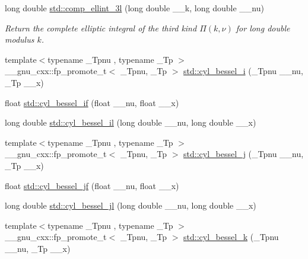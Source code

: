 \begin{DoxyCompactItemize}
long double \hyperlink{group__cxx17__math__spec__func_ga1ca081fee102cd0d4d6b091285e495e5}{std\+::comp\+\_\+ellint\+\_\+3l} (long double \+\_\+\+\_\+k, long double \+\_\+\+\_\+nu)
\begin{DoxyCompactList}\small\item\em Return the complete elliptic integral of the third kind $ \Pi(k,\nu) $ for {\ttfamily long double} modulus $ k $. \end{DoxyCompactList}\item 
{\footnotesize template$<$typename \+\_\+\+Tpnu , typename \+\_\+\+Tp $>$ }\\\+\_\+\+\_\+gnu\+\_\+cxx\+::fp\+\_\+promote\+\_\+t$<$ \+\_\+\+Tpnu, \+\_\+\+Tp $>$ \hyperlink{group__cxx17__math__spec__func_ga29504b6008798072b0b8d6ea5a50ec60}{std\+::cyl\+\_\+bessel\+\_\+i} (\+\_\+\+Tpnu \+\_\+\+\_\+nu, \+\_\+\+Tp \+\_\+\+\_\+x)
\item 
float \hyperlink{group__cxx17__math__spec__func_gaaf738427d4da0bda66bc2274dfb853a7}{std\+::cyl\+\_\+bessel\+\_\+if} (float \+\_\+\+\_\+nu, float \+\_\+\+\_\+x)
\item 
long double \hyperlink{group__cxx17__math__spec__func_gab7962629216d03efb8ecaa3f70c6878f}{std\+::cyl\+\_\+bessel\+\_\+il} (long double \+\_\+\+\_\+nu, long double \+\_\+\+\_\+x)
\item 
{\footnotesize template$<$typename \+\_\+\+Tpnu , typename \+\_\+\+Tp $>$ }\\\+\_\+\+\_\+gnu\+\_\+cxx\+::fp\+\_\+promote\+\_\+t$<$ \+\_\+\+Tpnu, \+\_\+\+Tp $>$ \hyperlink{group__cxx17__math__spec__func_ga644f7eb975809674db88768f2f115744}{std\+::cyl\+\_\+bessel\+\_\+j} (\+\_\+\+Tpnu \+\_\+\+\_\+nu, \+\_\+\+Tp \+\_\+\+\_\+x)
\item 
float \hyperlink{group__cxx17__math__spec__func_ga15731a7bccd6351d28353e3c4c2a2d23}{std\+::cyl\+\_\+bessel\+\_\+jf} (float \+\_\+\+\_\+nu, float \+\_\+\+\_\+x)
\item 
long double \hyperlink{group__cxx17__math__spec__func_gade8e94a80520a8b628b2d658755b25c0}{std\+::cyl\+\_\+bessel\+\_\+jl} (long double \+\_\+\+\_\+nu, long double \+\_\+\+\_\+x)
\item 
{\footnotesize template$<$typename \+\_\+\+Tpnu , typename \+\_\+\+Tp $>$ }\\\+\_\+\+\_\+gnu\+\_\+cxx\+::fp\+\_\+promote\+\_\+t$<$ \+\_\+\+Tpnu, \+\_\+\+Tp $>$ \hyperlink{group__cxx17__math__spec__func_gac73d664b8e7ceba7f8e786c93e97a084}{std\+::cyl\+\_\+bessel\+\_\+k} (\+\_\+\+Tpnu \+\_\+\+\_\+nu, \+\_\+\+Tp \+\_\+\+\_\+x)
\item 

\end{DoxyCompactItemize}
